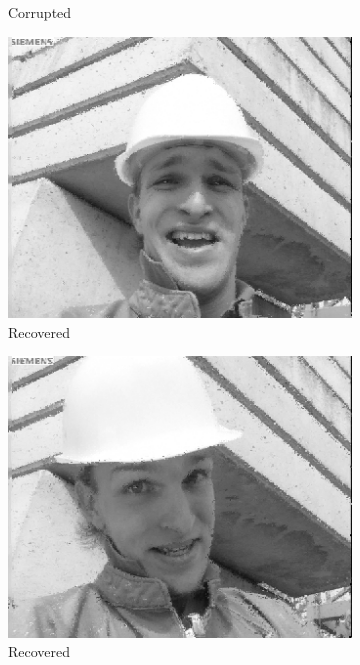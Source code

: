 \begin{figure}
\begin{subfigure}{0.4\textwidth}
    \caption{Corrupted}
  \end{subfigure}
  \begin{subfigure}{0.4\textwidth}
    \includegraphics[width=\textwidth]{Chapter5/Images/foreman_rec_21.png}
    \caption{Recovered}
  \end{subfigure}
  \begin{subfigure}{0.4\textwidth}
    \includegraphics[width=\textwidth]{Chapter5/Images/foreman_rec_151.png}
    \caption{Recovered}
  \end{subfigure}
  \begin{subfigure}{0.4\textwidth}

\end{subfigure}
\end{figure}
